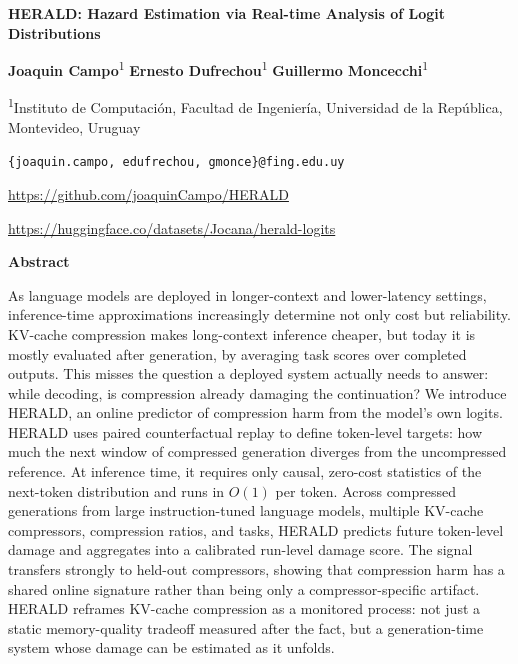 \documentclass[11pt,a4paper]{article}
\renewenvironment{abstract}{%
  \begin{center}
    {\large\bfseries Abstract}
  \end{center}
  \vspace{-0.4em}
  \begin{list}{}{%
    \setlength{\leftmargin}{0.55in}%
    \setlength{\rightmargin}{0.55in}%
    \setlength{\topsep}{0pt}%
  }\item[]\ignorespaces
}{%
  \unskip\end{list}\vspace{0.6em}
}
\begin{document}
\begin{flushleft}
  {\fontsize{20pt}{24pt}\selectfont\bfseries HERALD: Hazard Estimation via Real-time Analysis of Logit Distributions\par}
  \vspace{1em}
  {\large
    \textbf{Joaquin Campo}\textsuperscript{1} \quad
    \textbf{Ernesto Dufrechou}\textsuperscript{1} \quad
    \textbf{Guillermo Moncecchi}\textsuperscript{1}\par
  }
  \vspace{0.4em}
  \textsuperscript{1}Instituto de Computaci\'on, Facultad de Ingenier\'ia, Universidad de la Rep\'ublica, Montevideo, Uruguay\par
  \vspace{0.4em}
  \texttt{\{joaquin.campo, edufrechou, gmonce\}@fing.edu.uy}\par
  \vspace{0.4em}
  \url{https://github.com/joaquinCampo/HERALD}\par
  \vspace{0.2em}
  \url{https://huggingface.co/datasets/Jocana/herald-logits}
\end{flushleft}

\vspace{1.2em}

\begin{abstract}
\noindent
As language models are deployed in longer-context and lower-latency settings, inference-time approximations increasingly determine not only cost but reliability. KV-cache compression makes long-context inference cheaper, but today it is mostly evaluated after generation, by averaging task scores over completed outputs. This misses the question a deployed system actually needs to answer: while decoding, is compression already damaging the continuation? We introduce HERALD, an online predictor of compression harm from the model's own logits. HERALD uses paired counterfactual replay to define token-level targets: how much the next window of compressed generation diverges from the uncompressed reference. At inference time, it requires only causal, zero-cost statistics of the next-token distribution and runs in $O(1)$ per token. Across compressed generations from large instruction-tuned language models, multiple KV-cache compressors, compression ratios, and tasks, HERALD predicts future token-level damage and aggregates into a calibrated run-level damage score. The signal transfers strongly to held-out compressors, showing that compression harm has a shared online signature rather than being only a compressor-specific artifact. HERALD reframes KV-cache compression as a monitored process: not just a static memory-quality tradeoff measured after the fact, but a generation-time system whose damage can be estimated as it unfolds.
\end{abstract}
\end{document}
